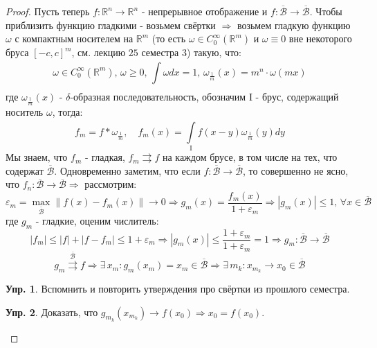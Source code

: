 \documentclass[12pt]{article}
\newcommand{\MR}{\mathbb{R}}
\newcommand{\MI}{\mathrm{I}}
\newcommand{\MB}{\mathcal{B}}
\newcommand{\VE}{\varepsilon}
\theoremstyle{definition}
\newtheorem{exrc}{Упр.}
\newcommand{\ddint}[2]{\displaystyle\int\limits_{#1}^{#2}}
\newcommand{\ovl}[1]{\overline{#1}}
\newcommand{\uconv}[1]{\overset{#1}{\rightrightarrows}}
\begin{document}
\begin{proof}
	 Пусть теперь $f \colon \MR^n \to \MR^n$ - непрерывное отображение и $f\colon \ovl{\MB} \to \ovl{\MB}$. Чтобы приблизить функцию гладкими - возьмем свёртки $\Rightarrow$ возьмем гладкую  функцию $\omega$ с компактным носителем на $\MR^m$ (то есть $\omega \in C_0^{\infty}(\MR^m)$ и $\omega \equiv 0$ вне некоторого бруса $[-c,c]^m$, см. лекцию $25$ семестра $3$) такую, что:
	 $$
	 	\omega \in C_0^{\infty}(\MR^m), \, \omega \geq 0, \, \ddint{}{}\omega dx =1, \, \omega_{\tfrac{1}{m}}(x) = m^n{\cdot}\omega(mx)
	 $$
	 где $\omega_{\frac{1}{m}}(x)$ - $\delta$-образная последовательность, обозначим $\MI$ - брус, содержащий носитель $\omega$, тогда:
	 $$
	 	f_m = f*\omega_{\tfrac{1}{m}}, \quad f_m(x) = \ddint{\MI}{}f(x - y)\omega_{\frac{1}{m}}(y)dy
	 $$
	 Мы знаем, что $f_m$ - гладкая, $f_m \uconv{}f$ на каждом брусе, в том числе на тех, что содержат $\ovl{\MB}$. Одновременно заметим, что если $f\colon \ovl{\MB} \to \ovl{\MB}$, то совершенно не ясно, что $f_n \colon \ovl{\MB} \to \ovl{\MB} \Rightarrow$ рассмотрим: 
	 $$
	 	\VE_m = \max\limits_{\ovl{\MB}}\|f(x) - f_m(x)\| \to 0 \Rightarrow g_m(x) = \dfrac{f_m(x)}{1 + \VE_m} \Rightarrow |g_m(x)| \leq 1, \, \forall x \in \ovl{\MB} 
	 $$
	 где $g_m$ - гладкие, оценим числитель:
	 $$
	 	|f_m| \leq |f| + |f - f_m| \leq 1 + \VE_m \Rightarrow |g_m(x)| \leq \dfrac{1 +  \VE_m}{1 + \VE_m} = 1 \Rightarrow g_m \colon \ovl{\MB} \to \ovl{\MB}
	 $$
	 $$	
	 	g_m \uconv{\ovl{\MB}}f \Rightarrow \exists \, x_m \colon g_m(x_m) = x_m \in \ovl{\MB} \Rightarrow \exists \, m_k  \colon x_{m_k} \to x_0 \in \ovl{\MB}
	 $$
	 \begin{exrc}
	 	Вспомнить и повторить утверждения про свёртки из прошлого семестра.
	 \end{exrc}
	 \begin{exrc}
	 	Доказать, что $g_{m_k}(x_{m_k}) \to f(x_0) \Rightarrow x_0 = f(x_0)$.
	 \end{exrc}
\end{proof}

\newpage
\end{document}
